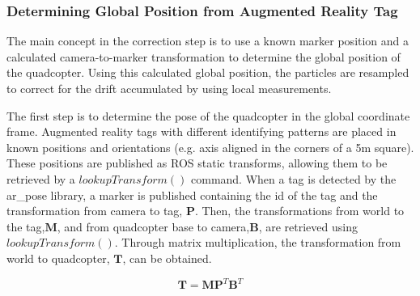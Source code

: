 \begin{spacing}{2.0}
\begin{algorithm}
\begin{algorithmic}[1]
				\\
				\\
					 
					\Else {}
					\EndIf
				\EndFor

				\\
				\\
				\\
				\EndFunction
			\end{algorithmic}
		\end{algorithm}
		\end{spacing}

		\subsubsection{Determining Global Position from Augmented Reality Tag}
			The main concept in the correction step is to use a known marker position and a calculated camera-to-marker transformation to determine the global position of the quadcopter. Using this calculated global position, the particles are resampled to correct for the drift accumulated by using local measurements.

			The first step is to determine the pose of the quadcopter in the global coordinate frame. Augmented reality tags with different identifying patterns are placed in known positions and orientations (e.g. axis aligned in the corners of a 5m square). These positions are published as ROS static transforms, allowing them to be retrieved by a $lookupTransform()$ command. When a tag is detected by the ar\_pose library, a marker is published containing the id of the tag and the transformation from camera to tag, $\textbf{P}$. Then, the transformations from world to the tag,$\textbf{M}$,  and from quadcopter base to camera,$\textbf{B}$, are retrieved using $lookupTransform()$. Through matrix multiplication, the transformation from world to quadcopter, $\textbf{T}$, can be obtained.

			\[\textbf{T} = \textbf{M}\textbf{P}^T\textbf{B}^T \]

